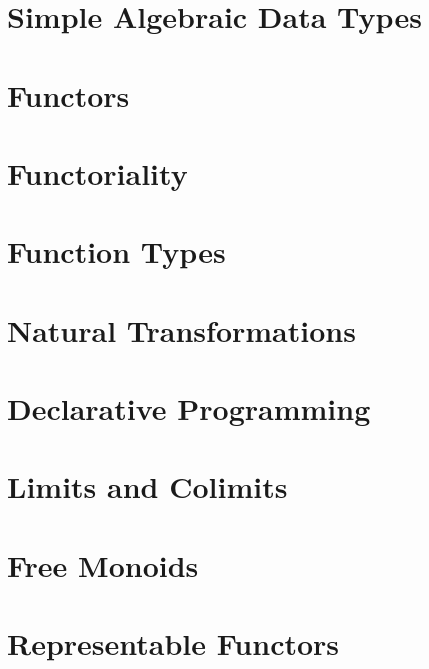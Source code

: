 \chapter{Simple Algebraic Data Types}\label{simple-algebraic-data-types}


\chapter{Functors}\label{functors}


\chapter{Functoriality}\label{functoriality}


\chapter{Function Types}\label{function-types}


\chapter{Natural Transformations}\label{natural-transformations}



\chapter{Declarative Programming}\label{declarative-programming}


\chapter{Limits and Colimits}\label{limits-and-colimits}


\chapter{Free Monoids}\label{free-monoids}


\chapter{Representable Functors}\label{representable-functors}


